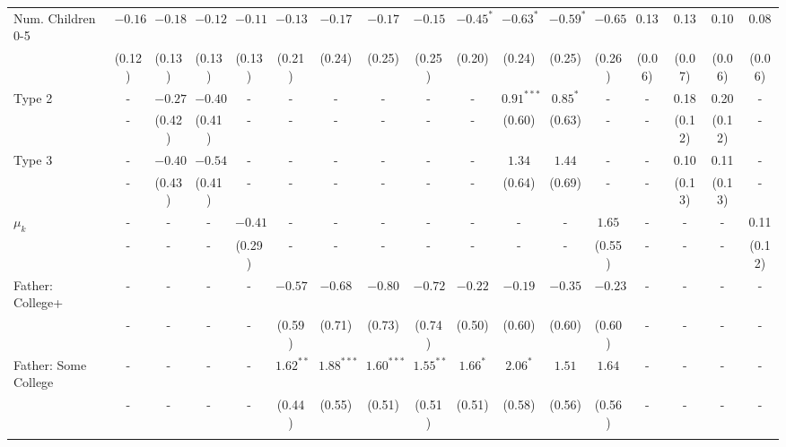 \begin{tabular}{lcccccccccccccccc}
Num. Children 0-5&$-0.16$&$-0.18$&$-0.12$&$-0.11$&$-0.13$&$-0.17$&$-0.17$&$-0.15$&$-0.45^{*}$&$-0.63^{*}$&$-0.59^{*}$&$-0.65$&0.13&0.13&0.10&0.08\\
&(0.12)&(0.13)&(0.13)&(0.13)&(0.21)&(0.24)&(0.25)&(0.25)&(0.20)&(0.24)&(0.25)&(0.26)&(0.06)&(0.07)&(0.06)&(0.06)\\
Type 2&-&$-0.27$&$-0.40$&-&-&-&-&-&-&$0.91^{***}$&$0.85^{*}$&-&-&0.18&0.20&-\\
&-&(0.42)&(0.41)&-&-&-&-&-&-&(0.60)&(0.63)&-&-&(0.12)&(0.12)&-\\
Type 3&-&$-0.40$&$-0.54$&-&-&-&-&-&-&$1.34$&$1.44$&-&-&0.10&0.11&-\\
&-&(0.43)&(0.41)&-&-&-&-&-&-&(0.64)&(0.69)&-&-&(0.13)&(0.13)&-\\
$\mu_{k}$&-&-&-&$-0.41$&-&-&-&-&-&-&-&$1.65$&-&-&-&0.11\\
&-&-&-&(0.29)&-&-&-&-&-&-&-&(0.55)&-&-&-&(0.12)\\
Father: College+&-&-&-&-&$-0.57$&$-0.68$&$-0.80$&$-0.72$&$-0.22$&$-0.19$&$-0.35$&$-0.23$&-&-&-&-\\
&-&-&-&-&(0.59)&(0.71)&(0.73)&(0.74)&(0.50)&(0.60)&(0.60)&(0.60)&-&-&-&-\\
Father: Some College&-&-&-&-&$1.62^{**}$&$1.88^{***}$&$1.60^{***}$&$1.55^{**}$&$1.66^{*}$&$2.06^{*}$&$1.51$&$1.64$&-&-&-&-\\
&-&-&-&-&(0.44)&(0.55)&(0.51)&(0.51)&(0.51)&(0.58)&(0.56)&(0.56)&-&-&-&-\\
\\
\bottomrule\end{tabular}